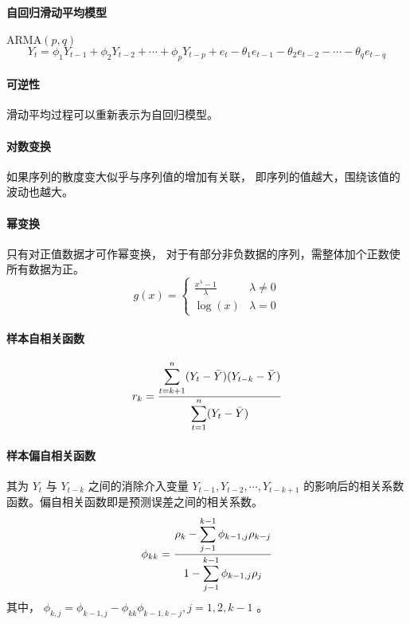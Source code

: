\documentclass[UTF8,hyperref,a4paper]{ctexart}
\begin{document}
        \paragraph{自回归滑动平均模型}  $ \mathrm{ARMA}(p,q) $
        $$ Y_t = \phi_1 Y_{t-1} + \phi_2 Y_{t-2} + \cdots + \phi_p Y_{t-p} + e_t
               - \theta_1 e_{t-1} - \theta_2 e_{t-2} - \cdots - \theta_q e_{t-q} $$ 
        
        \paragraph{可逆性} 滑动平均过程可以重新表示为自回归模型。

        \paragraph{对数变换} 如果序列的散度变大似乎与序列值的增加有关联，
        即序列的值越大，围绕该值的波动也越大。

        \paragraph{幂变换} 只有对正值数据才可作幂变换，
        对于有部分非负数据的序列，需整体加个正数使所有数据为正。
        $$ g(x) = \left\{ \begin{array}{ll}
            \frac{x^\lambda - 1}{\lambda} & \lambda \neq 0 \\
            \log (x) & \lambda = 0
        \end{array} \right. $$ 

        \paragraph{样本自相关函数}
        $$ r_k = \displaystyle{\frac{\displaystyle{
            \sum_{t=k+1}^n (Y_t - \bar{Y})(Y_{t-k} - \bar{Y})
        }}{\displaystyle{
            \sum _{t=1}^{n} (Y_t - \bar{Y})
        }}} $$

        \paragraph{样本偏自相关函数}
        其为 $ Y_t $ 与 $ Y_{t−k} $ 之间的消除介入变量 $ Y_{t−1}, Y_{t−2}, \cdots, Y_{t−k+1}$
        的影响后的相关系数函数。偏自相关函数即是预测误差之间的相关系数。
        $$ \phi_{kk} = \displaystyle{\frac{\displaystyle{
            \rho_k - \sum _{j-1}^{k-1} \phi_{k-1,j} \rho_{k-j}
        }}{\displaystyle{
            1 - \sum _{j-1}^{k-1} \phi_{k-1,j} \rho_{j}
        }}} $$ 
        其中， $ \phi_{k,j} = \phi_{k-1,j} - \phi_{kk}\phi_{k-1,k-j}, j = 1, 2, k-1 $ 。
\end{document}
